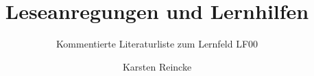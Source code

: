 \documentclass[
  DIV=calc,
  BCOR=5mm,
  11pt,
  headings=small,
  oneside,
  abstract=true,
  toc=bib,
  english,ngerman]{scrartcl}
\def\bibGl{../../bib.gl}
\def\cfgGl{../../cfg.gl/}
\def\cfgLf{../cfg.lf}
\begin{document}
\nocite{*}

\titlehead{Ausbildung zur Fachinformatikerin}
\subject{Release }
\title{Leseanregungen und Lernhilfen}

\subtitle{Kommentierte Literaturliste zum Lernfeld LF00}
\author{Karsten Reincke}

\maketitle

\printbibliography


\printnomenclature
\end{document}
